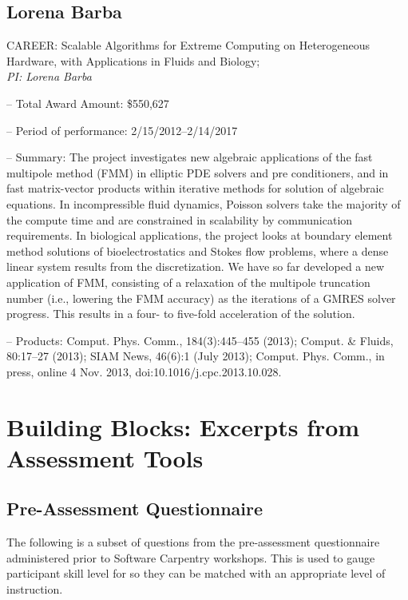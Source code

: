 \documentclass{proposalnsf}
\begin{document}
\subsection{Lorena Barba}


CAREER:  Scalable Algorithms for Extreme Computing on Heterogeneous  Hardware, with Applications in Fluids and Biology;\\  {\it PI: Lorena Barba}
\begin{compactitem}
\item[--] Total Award Amount: \$550,627
\item[--] Period of performance: 2/15/2012--2/14/2017
\item[--] Summary: The project investigates new algebraic applications of the fast multipole method (FMM) in elliptic PDE solvers and pre conditioners, and in fast matrix-vector products within iterative methods for solution of algebraic equations. In incompressible fluid dynamics, Poisson solvers take the majority of the compute time and are constrained in scalability by communication requirements. In biological applications, the project looks at boundary element method solutions of bioelectrostatics and Stokes flow problems, where a dense linear system results from the discretization. We have so far developed a new application of FMM, consisting of a relaxation of the multipole truncation number (i.e., lowering the FMM accuracy) as the iterations of a GMRES solver progress. This results in a four- to five-fold acceleration of the solution.
\item[--] Products: Comput. Phys. Comm., 184(3):445--455 (2013); Comput. \& Fluids, 80:17--27 (2013); SIAM News, 46(6):1 (July 2013); Comput. Phys. Comm., in press, online 4 Nov. 2013, doi:10.1016/j.cpc.2013.10.028.
\end{compactitem}

\section{Building Blocks: Excerpts from Assessment Tools}
\subsection{Pre-Assessment Questionnaire}
\label{sec:questionnaire}
The following is a subset of questions from the pre-assessment
questionnaire administered prior to Software Carpentry workshops. 
This is used  to gauge participant skill level for so they can be
matched with an appropriate level of instruction.
\end{document}
